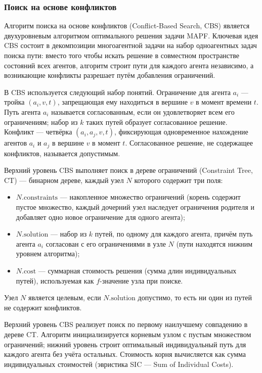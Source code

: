 \subsubsection{Поиск на основе конфликтов}

Алгоритм поиска на основе конфликтов (Conflict-Based Search, CBS) является двухуровневым алгоритмом
оптимального решения задачи MAPF. Ключевая идея CBS состоит в декомпозиции многоагентной задачи
на набор одноагентных задач поиска пути: вместо того чтобы искать решение в совместном пространстве
состояний всех агентов, алгоритм строит пути для каждого агента независимо, а возникающие конфликты
разрешает путём добавления ограничений.

В CBS используется следующий набор понятий. Ограничение для агента $a_i$ --- тройка $(a_i, v, t)$,
запрещающая ему находиться в вершине $v$ в момент времени $t$. Путь агента $a_i$ называется
согласованным, если он удовлетворяет всем его ограничениям; набор из $k$ таких путей образует
согласованное решение. Конфликт --- четвёрка $(a_i, a_j, v, t)$, фиксирующая одновременное
нахождение агентов $a_i$ и $a_j$ в вершине $v$ в момент $t$. Согласованное решение, не содержащее
конфликтов, называется допустимым.

Верхний уровень CBS выполняет поиск в дереве ограничений (Constraint Tree, CT) ---
бинарном дереве, каждый узел $N$ которого содержит три поля:
\begin{itemize}
    \item $N.\mathrm{constraints}$ --- накопленное множество ограничений (корень содержит пустое множество,
    каждый дочерний узел наследует ограничения родителя и добавляет одно новое ограничение для одного
    агента);
    \item $N.\mathrm{solution}$ --- набор из $k$ путей, по одному для каждого агента, причём путь агента $a_i$
    согласован с его ограничениями в узле $N$ (пути находятся нижним уровнем алгоритма);
    \item $N.\mathrm{cost}$ --- суммарная стоимость решения (сумма длин индивидуальных путей),
    используемая как $f$-значение узла при поиске.
\end{itemize}

Узел $N$ является целевым, если $N.\mathrm{solution}$ допустимо, то есть ни один из путей
не содержит конфликтов.

Верхний уровень CBS реализует поиск по первому наилучшему совпадению в дереве CT.
Алгоритм инициализируется корневым узлом с пустым множеством ограничений; нижний уровень строит
оптимальный индивидуальный путь для каждого агента без учёта остальных. Стоимость корня вычисляется
как сумма индивидуальных стоимостей (эвристика SIC --- Sum of Individual Costs).

